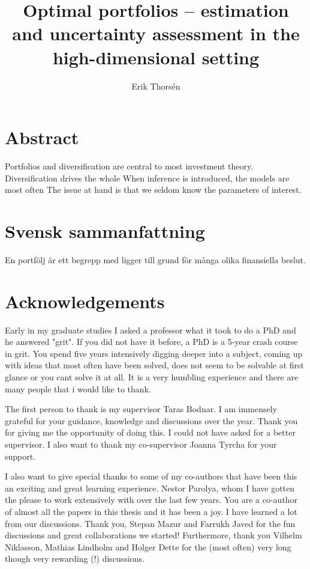 \documentclass[oneside]{book}\usepackage{knitr}
\title{Optimal portfolios -- estimation and uncertainty assessment in the high-dimensional setting}
\author{Erik Thorsén}
\begin{document}


\maketitle


\chapter*{\centering Abstract}
Portfolios and diversification are central to most investment theory.
Diversification drives the whole 
When inference is introduced, the models are most often 
The issue at hand is that we seldom know the parameters of interest.

\chapter*{\centering Svensk sammanfattning}
En portfölj är ett begrepp med  ligger till grund för många olika finansiella beslut.


\chapter*{Acknowledgements}

Early in my graduate studies I asked a professor what it took to do a PhD and he answered "grit".
If you did not have it before, a PhD is a 5-year crash course in grit.
You spend five years intensively digging deeper into a subject, coming up with ideas that most often have been solved, does not seem to be solvable at first glance or you cant solve it at all.
It is a very humbling experience and there are many people that i would like to thank.

The first person to thank is my supervisor Taras Bodnar. 
I am immensely grateful for your guidance, knowledge and discussions over the year. 
Thank you for giving me the opportunity of doing this.
I could not have asked for a better supervisor.
I also want to thank my co-supervisor Joanna Tyrcha for your support.

I also want to give special thanks to some of my co-authors that have been this an exciting and great learning experience.
Nestor Parolya, whom I have gotten the please to work extensively with over the last few years. 
You are a co-author of almost all the papers in this thesis and it has been a joy.
I have learned a lot from our discussions.
Thank you, Stepan Mazur and Farrukh Javed for the fun discussions and great collaborations we started!
Furthermore, thank you Vilhelm Niklasson, Mathias Lindholm and Holger Dette for the (most often) very long though very rewarding (!) discussions. 
\end{document}
